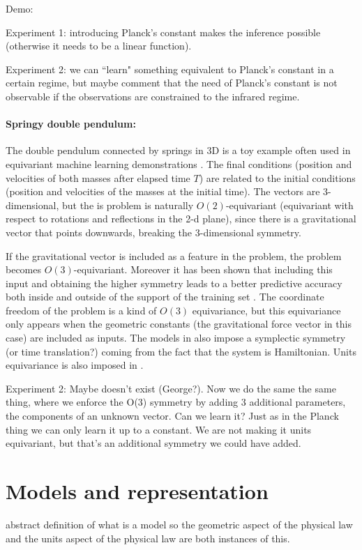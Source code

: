 \documentclass{article}
\begin{document}
Demo:

Experiment 1: introducing Planck's constant makes the inference possible (otherwise it needs to be a linear function). 

Experiment 2: we can ``learn" something equivalent to Planck's constant in a certain regime, but maybe comment that the need of Planck's constant is not observable if the observations are constrained to the infrared regime.


\paragraph{Springy double pendulum:}
The double pendulum connected by springs in 3D is a toy example often used in equivariant machine learning demonstrations \cite{finzi2021practical}. 
The final conditions (position and velocities of both masses after elapsed time $T$) are related to the initial conditions (position and velocities of the masses at the initial time).
The vectors are 3-dimensional, but the is problem is naturally $O(2)$-equivariant (equivariant with respect to rotations and reflections in the 2-d plane), since there is a gravitational vector that points downwards, breaking the 3-dimensional symmetry.

If the gravitational vector is included as a feature in the problem, the problem becomes $O(3)$-equivariant. Moreover it has been shown that including this input and obtaining the higher symmetry leads to a better predictive accuracy both inside and outside of the support of the training set \cite{yao2021simple}. The coordinate freedom of the problem is a kind of $O(3)$ equivariance, but this equivariance only appears when the geometric constants (the gravitational force vector in this case) are included as inputs. The models in \cite{finzi2021practical,yao2021simple, villar2022dimensionless} also impose a symplectic symmetry (or time translation?) coming from the fact that the system is Hamiltonian. Units equivariance is also imposed in \cite{villar2022dimensionless}.


Experiment 2: Maybe doesn't exist (George?). Now we do the same the same thing, where we enforce the O(3) symmetry by adding 3 additional parameters, the components of an unknown vector. Can we learn it? Just as in the Planck thing we can only learn it up to a constant. We are not making it units equivariant, but that's an additional symmetry we could have added. 




\section{Models and representation}
abstract definition of what is a model so the geometric aspect of the physical law and the units aspect of the physical law are both instances of this. 
\end{document}
